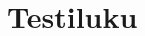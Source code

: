\chapter{Testiluku}

\begin{kuvaajapohja}{2}{-3.14}{3.14}{-1.25}{1.25}
\end{kuvaajapohja}

\begin{kuvaajapohja}{2}{-3.14}{3.14}{-1.25}{1.25}
\end{kuvaajapohja}

\begin{lukusuora}{-1}{1}{10}
\end{lukusuora}

